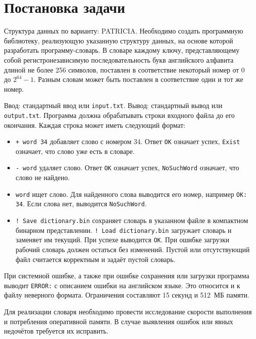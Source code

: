 \section{Постановка задачи}
\label{sec:problem}
\begingroup
\raggedright

Структура данных по варианту: PATRICIA. Необходимо создать программную библиотеку, реализующую указанную структуру данных, на основе которой разработать программу-словарь. В словаре каждому ключу, представляющему собой регистронезависимую последовательность букв английского алфавита длиной не более 256 символов, поставлен в соответствие некоторый номер от \(0\) до \(2^{64}-1\). Разным словам может быть поставлен в соответствие один и тот же номер.

Ввод: стандартный ввод или \texttt{input.txt}. Вывод: стандартный вывод или \texttt{output.txt}. Программа должна обрабатывать строки входного файла до его окончания. Каждая строка может иметь следующий формат:

\begin{itemize}
  \setlength{\itemsep}{0pt}
  \item \texttt{+ word 34} добавляет слово с номером 34. Ответ \texttt{OK} означает успех, \texttt{Exist} означает, что слово уже есть в словаре.
  \item \texttt{- word} удаляет слово. Ответ \texttt{OK} означает успех, \texttt{NoSuchWord} означает, что слово не найдено.
  \item \texttt{word} ищет слово. Для найденного слова выводится его номер, например \mbox{\texttt{OK: 34}}. Если слова нет, выводится \texttt{NoSuchWord}.
  \item \texttt{! Save dictionary.bin} сохраняет словарь в указанном файле в компактном бинарном представлении. \texttt{! Load dictionary.bin} загружает словарь и заменяет им текущий. При успехе выводится \texttt{OK}. При ошибке загрузки рабочий словарь должен остаться без изменений. Пустой или отсутствующий файл считается корректным и задаёт пустой словарь.
\end{itemize}

При системной ошибке, а также при ошибке сохранения или загрузки программа выводит \texttt{ERROR:} с описанием ошибки на английском языке. Это относится и к файлу неверного формата. Ограничения составляют 15 секунд и 512~МБ памяти.

Для реализации словаря необходимо провести исследование скорости выполнения и потребления оперативной памяти. В случае выявления ошибок или явных недочётов требуется их исправить.
\par
\endgroup
